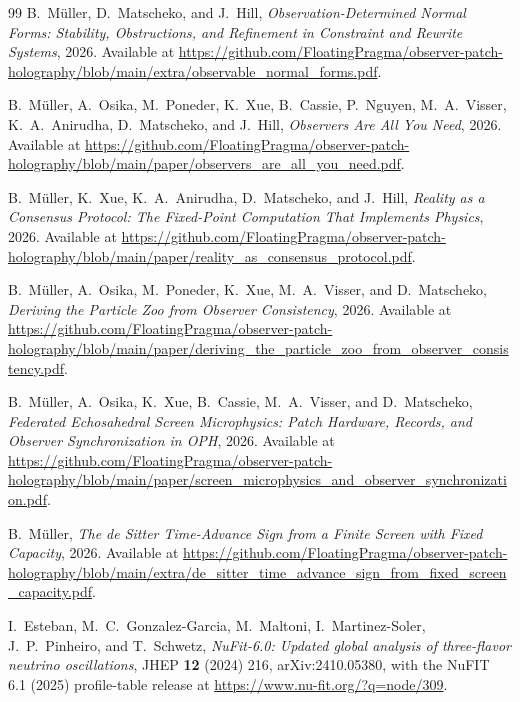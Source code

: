 \documentclass[11pt]{article}
\begin{document}
\begin{thebibliography}{99}
B.~M\"uller, D.~Matscheko, and J.~Hill,
\emph{Observation-Determined Normal Forms: Stability, Obstructions, and Refinement in Constraint and Rewrite Systems},
2026.
Available at \url{https://github.com/FloatingPragma/observer-patch-holography/blob/main/extra/observable_normal_forms.pdf}.

B.~M\"uller, A.~Osika, M.~Poneder, K.~Xue, B.~Cassie, P.~Nguyen, M.~A.~Visser, K.~A.~Anirudha, D.~Matscheko, and J.~Hill,
\emph{Observers Are All You Need},
2026.
Available at \url{https://github.com/FloatingPragma/observer-patch-holography/blob/main/paper/observers_are_all_you_need.pdf}.

B.~M\"uller, K.~Xue, K.~A.~Anirudha, D.~Matscheko, and J.~Hill,
\emph{Reality as a Consensus Protocol: The Fixed-Point Computation That Implements Physics},
2026.
Available at \url{https://github.com/FloatingPragma/observer-patch-holography/blob/main/paper/reality_as_consensus_protocol.pdf}.

B.~M\"uller, A.~Osika, M.~Poneder, K.~Xue, M.~A.~Visser, and D.~Matscheko,
\emph{Deriving the Particle Zoo from Observer Consistency},
2026.
Available at \url{https://github.com/FloatingPragma/observer-patch-holography/blob/main/paper/deriving_the_particle_zoo_from_observer_consistency.pdf}.

B.~M\"uller, A.~Osika, K.~Xue, B.~Cassie, M.~A.~Visser, and D.~Matscheko,
\emph{Federated Echosahedral Screen Microphysics: Patch Hardware, Records, and Observer Synchronization in OPH},
2026.
Available at \url{https://github.com/FloatingPragma/observer-patch-holography/blob/main/paper/screen_microphysics_and_observer_synchronization.pdf}.

B.~M\"uller,
\emph{The de Sitter Time-Advance Sign from a Finite Screen with Fixed Capacity},
2026.
Available at
\url{https://github.com/FloatingPragma/observer-patch-holography/blob/main/extra/de_sitter_time_advance_sign_from_fixed_screen_capacity.pdf}.


I.~Esteban, M.~C.~Gonzalez-Garcia, M.~Maltoni, I.~Martinez-Soler, J.~P.~Pinheiro, and T.~Schwetz,
\emph{NuFit-6.0: Updated global analysis of three-flavor neutrino oscillations},
JHEP \textbf{12} (2024) 216, arXiv:2410.05380,
with the NuFIT 6.1 (2025) profile-table release at \url{https://www.nu-fit.org/?q=node/309}.


\end{thebibliography}
\end{document}

